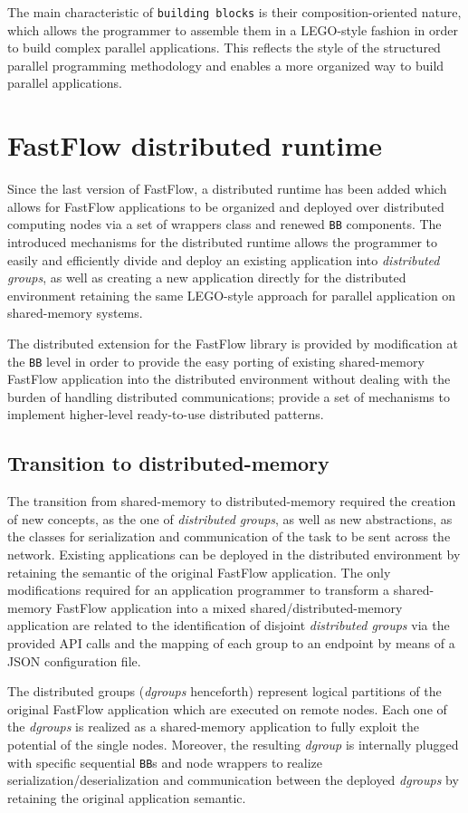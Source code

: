 The main characteristic of \texttt{building blocks} is their composition-oriented nature, which allows the programmer to assemble them in a LEGO-style fashion in order to build complex parallel applications. This reflects the style of the structured parallel programming methodology and enables a more organized way to build parallel applications.

\section{FastFlow distributed runtime}
Since the last version of FastFlow, a distributed runtime has been added which allows for FastFlow applications to be organized and deployed over distributed computing nodes via a set of wrappers class and renewed \texttt{BB} components. The introduced mechanisms for the distributed runtime allows the programmer to easily and efficiently divide and deploy an existing application into \textit{distributed groups}, as well as creating a new application directly for the distributed environment retaining the same LEGO-style approach for parallel application on shared-memory systems.\newline

The distributed extension for the FastFlow library is provided by modification at the \texttt{BB} level in order to provide the easy porting of existing shared-memory FastFlow application into the distributed environment without dealing with the burden of handling distributed communications; provide a set of mechanisms to implement higher-level ready-to-use distributed patterns.
\subsection{Transition to distributed-memory}
The transition from shared-memory to distributed-memory required the creation of new concepts, as the one of \textit{distributed groups}, as well as new abstractions, as the classes for serialization and communication of the task to be sent across the network. Existing applications can be deployed in the distributed environment by retaining the semantic of the original FastFlow application. The only modifications required for an application programmer to transform a shared-memory FastFlow application into a mixed shared/distributed-memory application are related to the identification of disjoint \textit{distributed groups} via the provided API calls and the mapping of each group to an endpoint by means of a JSON configuration file.

The distributed groups (\textit{dgroups} henceforth) represent logical partitions of the original FastFlow application which are executed on remote nodes. Each one of the \textit{dgroups} is realized as a shared-memory application to fully exploit the potential of the single nodes. Moreover, the resulting \textit{dgroup} is internally plugged with specific sequential \texttt{BB}s and node wrappers to realize serialization/deserialization and communication between the deployed \textit{dgroups} by retaining the original application semantic.

